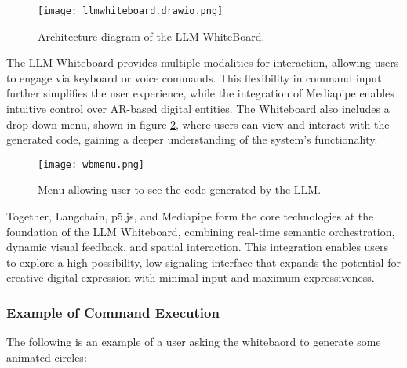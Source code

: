 \begin{figure}[h!]
    \centering
    \texttt{[image: llmwhiteboard.drawio.png]}
    \caption{Architecture diagram of the LLM WhiteBoard.}
    \vspace{0.1cm}
    \label{fig:wbarchietcure}
\end{figure}

The LLM Whiteboard provides multiple modalities for interaction, allowing users to engage via keyboard or voice commands.
This flexibility in command input further simplifies the user experience, while the integration of Mediapipe enables intuitive control over AR-based digital entities.
The Whiteboard also includes a drop-down menu, shown in figure \ref{fig:wbmenu}, where users can view and interact with the generated code, gaining a deeper understanding of the system’s functionality.

\begin{figure}[h!]
    \centering
    \texttt{[image: wbmenu.png]}
    \caption{Menu allowing user to see the code generated by the LLM.}
    \vspace{0.1cm}
    \label{fig:wbmenu}
\end{figure}

Together, Langchain, p5.js, and Mediapipe form the core technologies at the foundation of the LLM Whiteboard, combining real-time semantic orchestration, dynamic visual feedback, and spatial interaction.
This integration enables users to explore a high-possibility, low-signaling interface that expands the potential for creative digital expression with minimal input and maximum expressiveness.

\subsubsection{Example of Command Execution }

The following is an example of a user asking the whitebaord to generate some animated circles:

